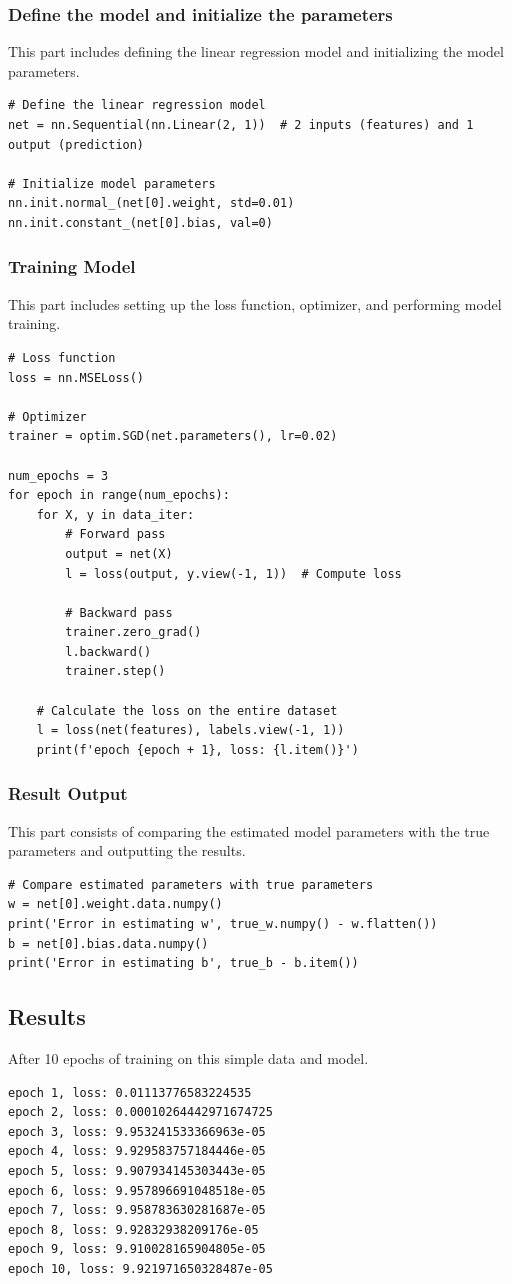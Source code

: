 \documentclass[a4paper,12pt]{article}
\begin{document}
\subsubsection{Define the model and initialize the parameters}
This part includes defining the linear regression model and initializing the model parameters.
\begin{lstlisting}
# Define the linear regression model
net = nn.Sequential(nn.Linear(2, 1))  # 2 inputs (features) and 1 output (prediction)

# Initialize model parameters
nn.init.normal_(net[0].weight, std=0.01)
nn.init.constant_(net[0].bias, val=0)
\end{lstlisting}

\subsubsection{Training Model}
This part includes setting up the loss function, optimizer, and performing model training.
\begin{lstlisting}
# Loss function
loss = nn.MSELoss()

# Optimizer
trainer = optim.SGD(net.parameters(), lr=0.02)

num_epochs = 3
for epoch in range(num_epochs):
    for X, y in data_iter:
        # Forward pass
        output = net(X)
        l = loss(output, y.view(-1, 1))  # Compute loss

        # Backward pass
        trainer.zero_grad()
        l.backward()
        trainer.step()

    # Calculate the loss on the entire dataset
    l = loss(net(features), labels.view(-1, 1))
    print(f'epoch {epoch + 1}, loss: {l.item()}')
\end{lstlisting}

\subsubsection{Result Output}
This part consists of comparing the estimated model parameters with the true parameters and outputting the results.
\begin{lstlisting}
# Compare estimated parameters with true parameters
w = net[0].weight.data.numpy()
print('Error in estimating w', true_w.numpy() - w.flatten())
b = net[0].bias.data.numpy()
print('Error in estimating b', true_b - b.item())
\end{lstlisting}

\subsection{Results}
After 10 epochs of training on this simple data and model.
\begin{lstlisting}
epoch 1, loss: 0.01113776583224535
epoch 2, loss: 0.00010264442971674725
epoch 3, loss: 9.953241533366963e-05
epoch 4, loss: 9.929583757184446e-05
epoch 5, loss: 9.907934145303443e-05
epoch 6, loss: 9.957896691048518e-05
epoch 7, loss: 9.958783630281687e-05
epoch 8, loss: 9.92832938209176e-05
epoch 9, loss: 9.910028165904805e-05
epoch 10, loss: 9.921971650328487e-05
\end{lstlisting}
\end{document}
